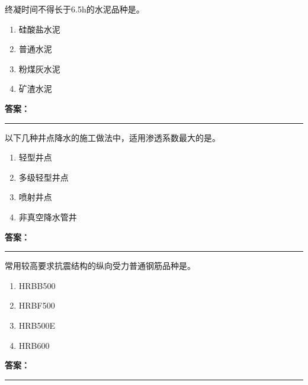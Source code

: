 \documentclass[UTF8,fontset=fandol,11pt]{ctexart}
\newcommand{\answerline}{\textcolor{answerred}{\rule{2.4cm}{0.7pt}}}
\begin{document}
\begin{quizbox}[title={乱序第 172 题｜第四章混凝土结构工程}]

终凝时间不得长于6.5h的水泥品种是。\\

\begin{enumerate}[label=\Alph*.]

\item 硅酸盐水泥

\item 普通水泥

\item 粉煤灰水泥

\item 矿渣水泥

\end{enumerate}

\textbf{\textcolor{answerred}{答案：}} \answerline

\end{quizbox}

\vspace{0.2em}

\begin{quizbox}[title={乱序第 173 题｜第三章基坑工程}]

以下几种井点降水的施工做法中，适用渗透系数最大的是。\\

\begin{enumerate}[label=\Alph*.]

\item 轻型井点

\item 多级轻型井点

\item 喷射井点

\item 非真空降水管井

\end{enumerate}

\textbf{\textcolor{answerred}{答案：}} \answerline

\end{quizbox}

\vspace{0.2em}

\begin{quizbox}[title={乱序第 174 题｜第四章混凝土结构工程}]

常用较高要求抗震结构的纵向受力普通钢筋品种是。\\

\begin{enumerate}[label=\Alph*.]

\item HRBB500

\item HRBF500

\item HRB500E

\item HRB600

\end{enumerate}

\textbf{\textcolor{answerred}{答案：}} \answerline

\end{quizbox}
\end{document}
